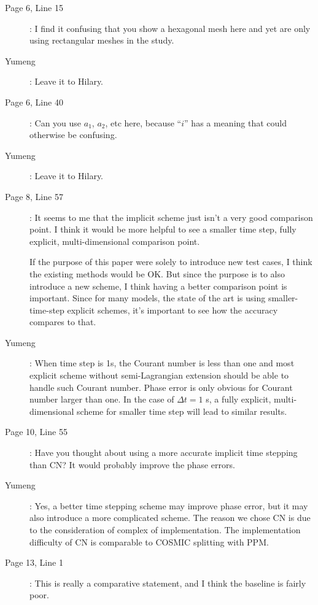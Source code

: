 \documentclass[12pt,a4paper]{article}
\begin{document}
\begin{description}
\item [Page 6, Line 15]: I find it confusing that you show a hexagonal mesh here and yet are only using rectangular meshes in the study.

\item [Yumeng]: Leave it to Hilary.

\item [Page 6, Line 40]: Can you use $a_1$, $a_2$, etc here, because ``$i$'' has a meaning that could otherwise be confusing.

\item [Yumeng]: Leave it to Hilary.

\item [Page 8, Line 57]: It seems to me that the implicit scheme just isn't a very good comparison point. I think it would be more helpful to see a smaller time step, fully explicit, multi-dimensional comparison point.

If the purpose of this paper were solely to introduce new test cases, I think the existing methods would be OK. But since the purpose is to also introduce a new scheme, I think having a better comparison point is important. Since for many models, the state of the art is using smaller-time-step explicit schemes, it's important to see how the accuracy compares to that.

\item [Yumeng]: When time step is 1s, the Courant number is less than one and most explicit scheme without semi-Lagrangian extension should be able to handle such Courant number. Phase error is only obvious for Courant number larger than one. In the case of $\Delta t = 1$ s, a fully explicit, multi-dimensional scheme for smaller time step will lead to similar results. 

\item [Page 10, Line 55]: Have you thought about using a more accurate implicit time stepping than CN? It would probably improve the phase errors.

\item [Yumeng]: Yes, a better time stepping scheme may improve phase error, but it may also introduce a more complicated scheme. The reason we chose CN is due to the consideration of complex of implementation. The implementation difficulty of CN is comparable to COSMIC splitting with PPM. 

\item [Page 13, Line 1]: This is really a comparative statement, and I think the baseline is fairly poor.


\end{description}
\end{document}
